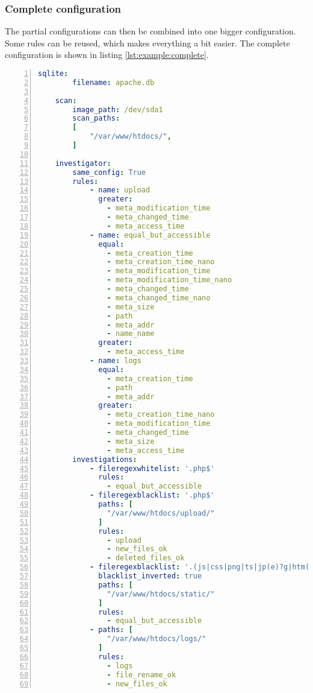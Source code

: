 \subsubsection{Complete configuration}

The partial configurations can then be combined into one bigger configuration. Some rules can be reused, which makes everything a bit easier. The complete configuration is shown in listing \ref{lst:example:complete}.

\begin{lstlisting}[language=yaml, numbers=left, caption=Scanner Configuration, label=lst:example:complete]
    sqlite:
        filename: apache.db
    
    scan:
        image_path: /dev/sda1
        scan_paths: 
        [
            "/var/www/htdocs/",
        ]

    investigator:
        same_config: True
        rules: 
            - name: upload
              greater:
                - meta_modification_time
                - meta_changed_time
                - meta_access_time
            - name: equal_but_accessible
              equal:
                - meta_creation_time
                - meta_creation_time_nano
                - meta_modification_time
                - meta_modification_time_nano
                - meta_changed_time
                - meta_changed_time_nano
                - meta_size
                - path
                - meta_addr
                - name_name
              greater:
                - meta_access_time
            - name: logs
              equal:
                - meta_creation_time
                - path
                - meta_addr
              greater:
                - meta_creation_time_nano
                - meta_modification_time
                - meta_changed_time
                - meta_size
                - meta_access_time
        investigations:
            - fileregexwhitelist: '.php$'
              rules:
                - equal_but_accessible
            - fileregexblacklist: '.php$'
              paths: [
                "/var/www/htdocs/upload/"
              ]
              rules:
                - upload
                - new_files_ok
                - deleted_files_ok
            - fileregexblacklist: '.(js|css|png|ts|jp(e)?g|htm(l)?)$'
              blacklist_inverted: true
              paths: [
                "/var/www/htdocs/static/"
              ]
              rules:
                - equal_but_accessible
            - paths: [
                "/var/www/htdocs/logs/"
              ]
              rules:
                - logs
                - file_rename_ok
                - new_files_ok

\end{lstlisting}

